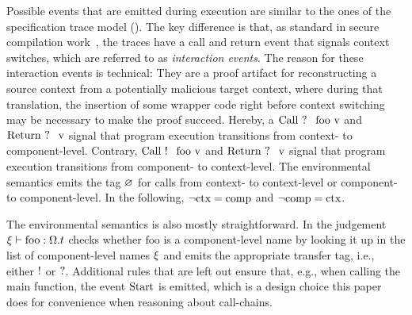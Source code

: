 \documentclass[utf8,acmsmall,review,screen,dvipsnames,anonymous]{acmart}
\begin{document}
Possible events that are emitted during execution are similar to the ones of the specification trace model ().
The key difference is that, as standard in secure compilation work~\cite{patrignani2021rsc,abate2019jour}, the traces have a call and return event that signals context switches, which are referred to as {\em interaction events}.
The reason for these interaction events is technical: They are a proof artifact for reconstructing a source context from a potentially malicious target context, where during that translation, the insertion of some wrapper code right before context switching may be necessary to make the proof succeed.
Hereby, a $\ev{Call\ \ctxtocomp\ foo\ \valueexpr}$ and $\ev{Return\ \ctxtocomp\ \valueexpr}$ signal that program execution transitions from context- to component-level.
Contrary, $\ev{Call\ \comptoctx\ foo\ \valueexpr}$ and $\ev{Return\ \ctxtocomp\ \valueexpr}$ signal that program execution transitions from component- to context-level.
The environmental semantics emits the tag $ \varnothing $ for calls from context- to context-level or component- to component-level.
In the following, $\neg\text{ctx}=\text{comp}$ and $\neg\text{comp}=\text{ctx}$.

\begin{center}
\end{center}

The environmental semantics is also mostly straightforward.
In  the judgement $\xi\vdash\text{foo}:\Omega.t$ checks whether $\text{foo}$ is a component-level name by looking it up in the list of component-level names $\xi$ and emits the appropriate transfer tag, i.e., either $ ! $ or $ ? $.
Additional rules that are left out ensure that, e.g., when calling the $\text{main}$ function, the event $\text{Start}$ is emitted, which is a design choice this paper does for convenience when reasoning about call-chains.
\end{document}
